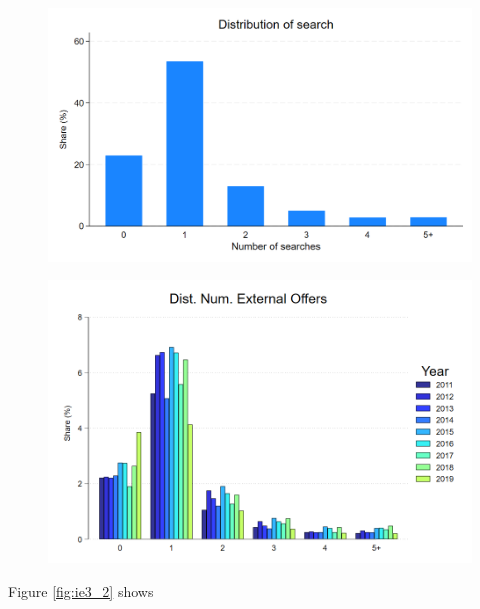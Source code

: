 \documentclass[12pt]{article}
\begin{document}
\begin{figure}[H]
\caption{}
\label{fig:ie3_0}
\centering{}%
\includegraphics[scale=0.27]{figures/IE3_dist_external_offers.png}
\end{figure}


\begin{figure}[H]
\caption{}
\label{fig:ie3_1}
\centering{}%
\includegraphics[scale=0.27]{figures/IE3_dist_external_offers_byyear.png}
\end{figure}


Figure \ref{fig:ie3_2} shows 
\end{document}
